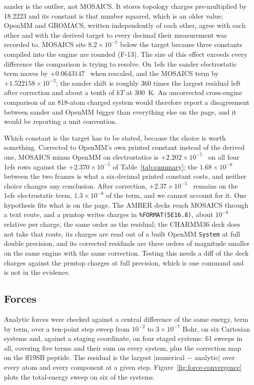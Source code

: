 sander is the outlier, not MOSAICS. It stores topology charges pre-multiplied
by 18.2223 and its constant is that number squared, which is an older value;
OpenMM and GROMACS, written independently of each other, agree with each other
and with the derived target to every decimal their measurement was recorded to.
MOSAICS sits $8.2\times10^{-7}$ below the target because three constants
compiled into the engine are rounded (F-13). The size of this effect exceeds
every difference the comparison is trying to resolve. On 1efs the sander
electrostatic term moves by $+0.0643147$~\kcal{} when rescaled, and the MOSAICS
term by $+1.522158\times10^{-3}$; the sander shift is roughly 360 times the
largest residual left after correction and about a tenth of $kT$ at 300~K. An
uncorrected cross-engine comparison of an 818-atom charged system would
therefore report a disagreement between sander and OpenMM bigger than
everything else on the page, and it would be reporting a unit convention.

Which constant is the target has to be stated, because the choice is worth
something. Corrected to OpenMM's own printed constant instead of the derived
one, MOSAICS minus OpenMM on electrostatics is $+2.202\times10^{-5}$~\kcal{} on
all four 1efs rows against the $+2.370\times10^{-5}$ of
Table~\ref{tab:summary}; the $1.68\times10^{-6}$ between the two frames is what
a six-decimal printed constant costs, and neither choice changes any
conclusion. After correction, $+2.37\times10^{-5}$~\kcal{} remains on the 1efs
electrostatic term, $1.3\times10^{-8}$ of the term, and we cannot account for
it. One hypothesis fits what is on the page. The AMBER decks reach MOSAICS
through a text route, and a prmtop writes charges in \texttt{\%FORMAT(5E16.8)},
about $10^{-8}$ relative per charge, the same order as the residual; the
CHARMM36 deck does not take that route, its charges are read out of a built
OpenMM \texttt{System} at full double precision, and its corrected residuals
are three orders of magnitude smaller on the same engine with the same
correction. Testing this needs a diff of the deck charges against the prmtop
charges at full precision, which is one command and is not in the evidence.

\subsection{Forces}
\label{sec:forces}

Analytic forces were checked against a central difference of the same energy,
term by term, over a ten-point step sweep from $10^{-2}$ to $3\times10^{-7}$
Bohr, on six Cartesian systems and, against a staging coordinate, on four
staged systems: 61 sweeps in all, covering five terms and their sum on every
system, plus the correction map on the ff19SB peptide. The residual is the
largest $|$numerical $-$ analytic$|$ over every atom and every component at a
given step. Figure~\ref{fig:force-convergence} plots the total-energy sweep on
six of the systems.

